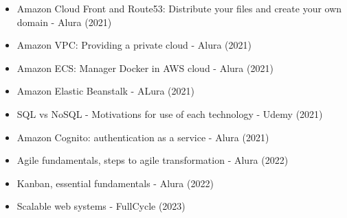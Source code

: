 \begin{itemize}
    \item Amazon Cloud Front and Route53: Distribute your files and create your own domain - Alura (2021)
    \item Amazon VPC: Providing a private cloud - Alura (2021)
    \item Amazon ECS: Manager Docker in AWS cloud - Alura (2021)
    \item Amazon Elastic Beanstalk - ALura (2021)
    \item SQL vs NoSQL - Motivations for use of each technology - Udemy (2021)
    \item Amazon Cognito: authentication as a service - Alura (2021)
    \item Agile fundamentals, steps to agile transformation - Alura (2022)
    \item Kanban, essential fundamentals - Alura (2022)
    \item Scalable web systems - FullCycle (2023)
\end{itemize}
